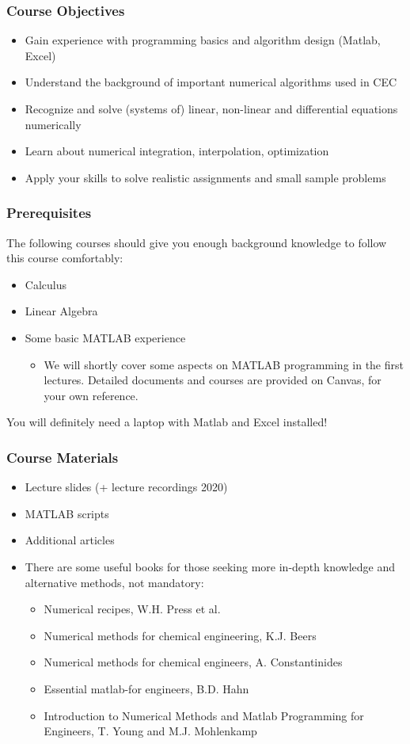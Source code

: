 \begin{frame}
 \frametitle{Course Objectives}
 \begin{itemize}
  \item Gain experience with programming basics and algorithm design (Matlab, Excel)
  \item Understand the background of important numerical algorithms used in CEC 
  \item Recognize and solve (systems of) linear, non-linear and differential equations numerically
  \item Learn about numerical integration, interpolation, optimization
  \item Apply your skills to solve realistic assignments and small sample problems
 \end{itemize}
\end{frame}

\begin{frame}
 \frametitle{Prerequisites}
  The following courses should give you enough background knowledge to follow this course comfortably:
 \begin{itemize}
   \item Calculus
   \item Linear Algebra
   \item Some basic MATLAB experience
     \begin{itemize}
      \item We will shortly cover some aspects on MATLAB programming in the first lectures. Detailed documents and courses are provided on Canvas, for your own reference.     
    \end{itemize}
  \end{itemize}
  You will definitely need a laptop with Matlab and Excel installed!
\end{frame}

\begin{frame}
 \frametitle{Course Materials}
 \begin{itemize}
  \item Lecture slides (+ lecture recordings 2020)
  \item MATLAB scripts
  \item Additional articles
  \item There are some useful books for those seeking more in-depth knowledge and alternative methods, not mandatory:
  \begin{itemize}
    \item Numerical recipes, W.H. Press et al.
    \item Numerical methods for chemical engineering, K.J. Beers
    \item Numerical methods for chemical engineers, A. Constantinides
    \item Essential matlab-for engineers, B.D. Hahn
    \item Introduction to Numerical Methods and Matlab Programming for Engineers, T. Young and M.J. Mohlenkamp
  \end{itemize}
 \end{itemize}
\end{frame}

